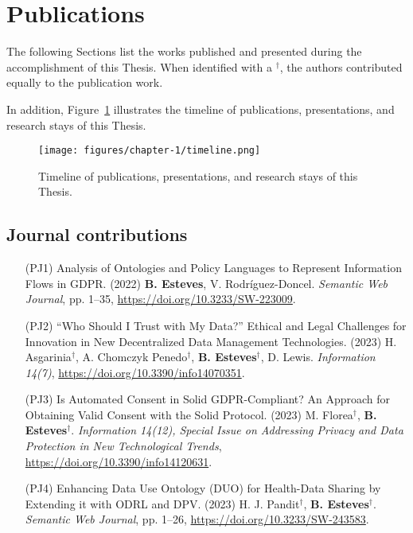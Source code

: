 \section{Publications}
\label{sec:publications}

The following Sections list the works published and presented during the accomplishment of this Thesis. When identified with a $^{\dagger}$, the authors contributed equally to the publication work.

In addition, Figure~\ref{fig:timeline} illustrates the timeline of publications, presentations, and research stays of this Thesis.

\begin{figure}
    \centering
    \texttt{[image: figures/chapter-1/timeline.png]}
    \caption{Timeline of publications, presentations, and research stays of this Thesis.}
    \label{fig:timeline}
\end{figure}

\subsection{Journal contributions}
\label{sec:publications_journal}

\begin{enumerate}
    \item [(PJ1)] Analysis of Ontologies and Policy Languages to Represent Information Flows in GDPR. (2022) \textbf{B. Esteves}, V. Rodríguez-Doncel. \textit{Semantic Web Journal}, pp. 1--35, \url{https://doi.org/10.3233/SW-223009}.
    \item [(PJ2)] ``Who Should I Trust with My Data?'' Ethical and Legal Challenges for Innovation in New Decentralized Data Management Technologies. (2023) H. Asgarinia$^{\dagger}$, A. Chomczyk Penedo$^{\dagger}$, \textbf{B. Esteves}$^{\dagger}$, D. Lewis. \textit{Information 14(7)}, \url{https://doi.org/10.3390/info14070351}.
    \item [(PJ3)] Is Automated Consent in Solid GDPR-Compliant? An Approach for Obtaining Valid Consent with the Solid Protocol. (2023) M. Florea$^{\dagger}$, \textbf{B. Esteves}$^{\dagger}$. \textit{Information 14(12), Special Issue on Addressing Privacy and Data Protection in New Technological Trends}, \url{https://doi.org/10.3390/info14120631}.
    \item [(PJ4)] Enhancing Data Use Ontology (DUO) for Health-Data Sharing by Extending it with ODRL and DPV. (2023) H. J. Pandit$^{\dagger}$, \textbf{B. Esteves}$^{\dagger}$.  \textit{Semantic Web Journal}, pp. 1--26, \url{https://doi.org/10.3233/SW-243583}.
\end{enumerate}


